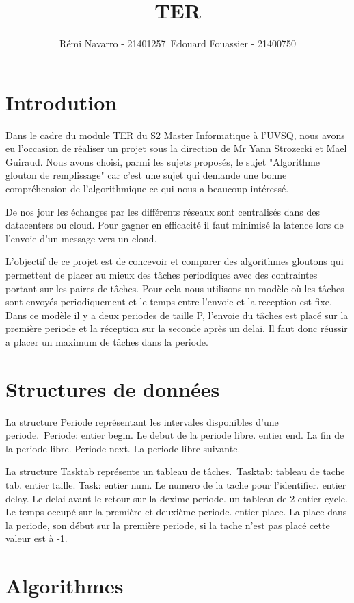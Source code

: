 \documentclass[11pt]{article}
\author{Rémi Navarro - 21401257\ Edouard Fouassier - 21400750}
\title{TER}
\begin{document}
\maketitle
\section{Introdution}
Dans le cadre du module TER du S2 Master Informatique à l’UVSQ, nous avons eu l’occasion de réaliser un projet sous la direction de Mr Yann Strozecki et Mael Guiraud.
Nous avons choisi, parmi les sujets proposés, le sujet "Algorithme glouton de remplissage" car c'est une sujet qui demande une bonne compréhension de l'algorithmique ce qui nous a beaucoup intéressé.

De nos jour les échanges par les différents réseaux sont centralisés dans des datacenters ou cloud.
Pour gagner en efficacité il faut minimisé la latence lors de l'envoie d'un message vers un cloud.

L'objectif de ce projet est de concevoir et comparer des algorithmes gloutons qui permettent de placer au mieux des tâches periodiques avec des contraintes portant sur les paires de tâches.
Pour cela nous utilisons un modèle où les tâches sont envoyés periodiquement et le temps entre l'envoie et la reception est fixe.
Dans ce modèle il y a deux periodes de taille P, l'envoie du tâches est placé sur la première periode et la réception sur la seconde après un delai.
Il faut donc réussir a placer un maximum de tâches dans la periode.

\section{Structures de données}
La structure Periode représentant les intervales disponibles d'une periode.\
Periode:
    entier begin. Le debut de la periode libre.
    entier end. La fin de la periode libre.
    Periode next. La periode libre suivante.

La structure Tasktab représente un tableau de tâches.\
Tasktab:
    tableau de tache tab. 
    entier taille.
Task:
    entier num. Le numero de la tache pour l'identifier.
    entier delay. Le delai avant le retour sur la dexime periode.
    un tableau de 2 entier cycle. Le temps occupé sur la première et deuxième periode.
    entier place. La place dans la periode, son début sur la première periode, si la tache n'est pas placé cette valeur est à -1.

\section{Algorithmes}
\end{document}
